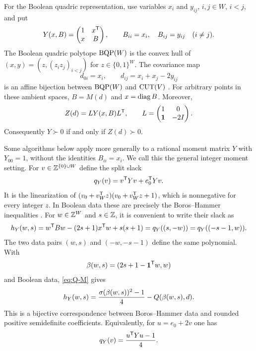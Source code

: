 For the Boolean quadric representation, use variables
$x_i$ and $y_{ij}$, $i,j\in W$, $i<j$, and put
\begin{equation}\label{eq:Y}
 Y(x,B)=\begin{pmatrix}1&x^{\mathsf T}\\x&B\end{pmatrix},\qquad
 B_{ii}=x_i,\quad B_{ij}=y_{ij}\quad(i\ne j).
\end{equation}
The Boolean quadric polytope $\operatorname{BQP}(W)$ is the convex hull of
$(x,y)=(z,(z_i z_j)_{i<j})$ for $z\in\{0,1\}^W$.
The covariance map
\begin{equation}\label{eq:covariance}
 d_{0i}=x_i,\qquad d_{ij}=x_i+x_j-2y_{ij}
\end{equation}
is an affine bijection between $\operatorname{BQP}(W)$ and $\operatorname{CUT}(V)$
\citep{Padberg1989,Letchford2022}.  For arbitrary points in these
ambient spaces, $B=M(d)$ and $x=\operatorname{diag} B$.
Moreover,
\begin{equation}\label{eq:congruence}
 Z(d)=L Y(x,B)L^{\mathsf T},\qquad
 L=\begin{pmatrix}1&0\\\mathbf 1&-2I\end{pmatrix}.
\end{equation}
Consequently $Y\succ0$ if and only if $Z(d)\succ0$.

Some algorithms below apply more generally to a rational moment matrix
$Y$ with $Y_{00}=1$, without the identities $B_{ii}=x_i$.
We call this the general integer moment setting.  For $v\in\mathbb Z^{\{0\}\cup W}$
define the split slack
\begin{equation}\label{eq:q}
 q_Y(v)=v^{\mathsf T} Yv+e_0^{\mathsf T} Yv.
\end{equation}
It is the linearization of
$(v_0+v_W^{\mathsf T} z)(v_0+v_W^{\mathsf T} z+1)$, which is nonnegative for every
integer $z$.  In Boolean data these are precisely the Boros--Hammer
inequalities \citep{BorosHammer1993,LetchfordSorensen2012}.
For $w\in\mathbb Z^W$ and $s\in\mathbb Z$, it is convenient to write their slack as
\begin{equation}\label{eq:BH}
 h_Y(w,s)=w^{\mathsf T} Bw-(2s+1)x^{\mathsf T} w+s(s+1)
          =q_Y((s,-w))=q_Y((-s-1,w)).
\end{equation}
The two data pairs $(w,s)$ and $(-w,-s-1)$ define the same polynomial.
With
\begin{equation}\label{eq:beta}
 \beta(w,s)=(2s+1-\mathbf 1^{\mathsf T} w,w)
\end{equation}
and Boolean data, \cref{eq:Q-M} gives
\begin{equation}\label{eq:BH-rounded}
 h_Y(w,s)=\frac{\sigma(\beta(w,s))^2-1}{4}-Q(\beta(w,s),d).
\end{equation}
This is a bijective correspondence between Boros--Hammer data and
rounded positive semidefinite coefficients.  Equivalently, for
$u=e_0+2v$ one has
\begin{equation}\label{eq:parity-split}
 q_Y(v)=\frac{u^{\mathsf T} Yu-1}{4}.
\end{equation}

